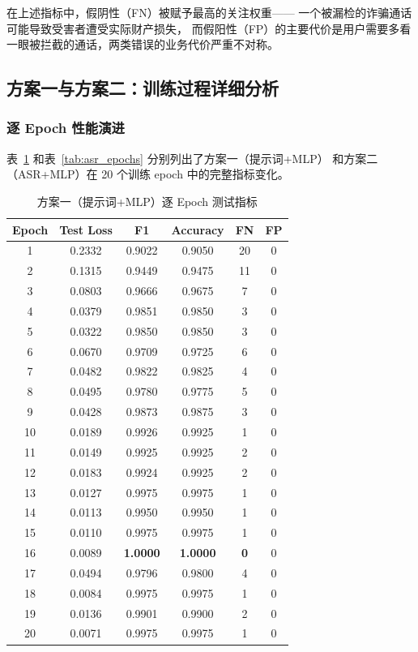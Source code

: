 \documentclass[11pt,a4paper]{ctexart}
\begin{document}
在上述指标中，假阴性（FN）被赋予最高的关注权重——
一个被漏检的诈骗通话可能导致受害者遭受实际财产损失，
而假阳性（FP）的主要代价是用户需要多看一眼被拦截的通话，两类错误的业务代价严重不对称。

\subsection{方案一与方案二：训练过程详细分析}

\subsubsection{逐 Epoch 性能演进}

表~\ref{tab:prompt_epochs} 和表~\ref{tab:asr_epochs} 分别列出了方案一（提示词+MLP）
和方案二（ASR+MLP）在 20 个训练 epoch 中的完整指标变化。

\begin{table}[H]\centering
\caption{方案一（提示词+MLP）逐 Epoch 测试指标}
\label{tab:prompt_epochs}
\begin{tabular}{@{}cccccc@{}}\toprule
\textbf{Epoch} & \textbf{Test Loss} & \textbf{F1} & \textbf{Accuracy} & \textbf{FN} & \textbf{FP}\\\midrule
1  & 0.2332 & 0.9022 & 0.9050 & 20 & 0\\
2  & 0.1315 & 0.9449 & 0.9475 & 11 & 0\\
3  & 0.0803 & 0.9666 & 0.9675 & 7  & 0\\
4  & 0.0379 & 0.9851 & 0.9850 & 3  & 0\\
5  & 0.0322 & 0.9850 & 0.9850 & 3  & 0\\
6  & 0.0670 & 0.9709 & 0.9725 & 6  & 0\\
7  & 0.0482 & 0.9822 & 0.9825 & 4  & 0\\
8  & 0.0495 & 0.9780 & 0.9775 & 5  & 0\\
9  & 0.0428 & 0.9873 & 0.9875 & 3  & 0\\
10 & 0.0189 & 0.9926 & 0.9925 & 1  & 0\\
11 & 0.0149 & 0.9925 & 0.9925 & 2  & 0\\
12 & 0.0183 & 0.9924 & 0.9925 & 2  & 0\\
13 & 0.0127 & 0.9975 & 0.9975 & 1  & 0\\
14 & 0.0113 & 0.9950 & 0.9950 & 1  & 0\\
15 & 0.0110 & 0.9975 & 0.9975 & 1  & 0\\
16 & 0.0089 & \textbf{1.0000} & \textbf{1.0000} & \textbf{0} & 0\\
17 & 0.0494 & 0.9796 & 0.9800 & 4  & 0\\
18 & 0.0084 & 0.9975 & 0.9975 & 1  & 0\\
19 & 0.0136 & 0.9901 & 0.9900 & 2  & 0\\
20 & 0.0071 & 0.9975 & 0.9975 & 1  & 0\\\bottomrule
\end{tabular}
\end{table}
\end{document}
